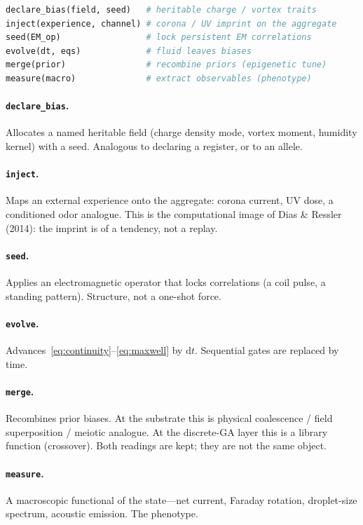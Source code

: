 \documentclass[11pt,a4paper]{article}
\begin{document}
\begin{lstlisting}[language=Python,morekeywords={declare_bias,inject,seed,evolve,merge,measure}]
declare_bias(field, seed)   # heritable charge / vortex traits
inject(experience, channel) # corona / UV imprint on the aggregate
seed(EM_op)                 # lock persistent EM correlations
evolve(dt, eqs)             # fluid leaves biases
merge(prior)                # recombine priors (epigenetic tune)
measure(macro)              # extract observables (phenotype)
\end{lstlisting}

\paragraph{\texttt{declare\_bias}.} Allocates a named heritable field (charge density mode, vortex moment, humidity kernel) with a seed. Analogous to declaring a register, or to an allele.

\paragraph{\texttt{inject}.} Maps an external experience onto the aggregate: corona current, UV dose, a conditioned odor analogue. This is the computational image of Dias \& Ressler (2014): the imprint is of a tendency, not a replay.

\paragraph{\texttt{seed}.} Applies an electromagnetic operator that locks correlations (a coil pulse, a standing pattern). Structure, not a one-shot force.

\paragraph{\texttt{evolve}.} Advances~\eqref{eq:continuity}--\eqref{eq:maxwell} by $\mathrm{d}t$. Sequential gates are replaced by time.

\paragraph{\texttt{merge}.} Recombines prior biases. At the substrate this is physical coalescence / field superposition / meiotic analogue. At the discrete-GA layer this is a library function (crossover). Both readings are kept; they are not the same object.

\paragraph{\texttt{measure}.} A macroscopic functional of the state---net current, Faraday rotation, droplet-size spectrum, acoustic emission. The phenotype.
\end{document}
